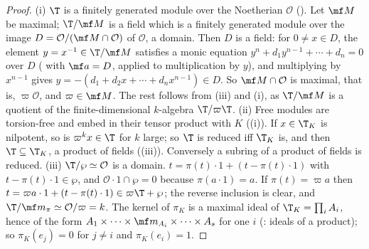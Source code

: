 \begin{proof}
(i) $\T$ is a finitely generated module over the Noetherian $\mathcal O$ (). Let $\mf M$ be maximal; $\T/\mf M$ is a field which is a finitely
generated module over the image $D=\mathcal O/(\mf M\cap\mathcal O)$ of $\mathcal O$, a domain. Then $D$ is a field: for $0\ne x\in D$, the element $y=x^{-1}\in\T/\mf M$ satisfies a monic
equation $y^n+d_1y^{n-1}+\cdots+d_n=0$ over $D$ ( with $\mf a=D$, applied to multiplication by $y$), and multiplying by $x^{n-1}$
gives $y=-(d_1+d_2x+\cdots+d_nx^{n-1})\in D$. So $\mf M\cap\mathcal O$ is maximal, that is, $\varpi\mathcal O$, and $\varpi\in\mf M$. The rest follows from
(iii) and (i), as $\T/\mf M$ is a quotient of the finite-dimensional $k$-algebra $\T/\varpi\T$.
(ii) Free modules are torsion-free and embed in their tensor product with $K$ ((i)). If $x\in\T_K$ is nilpotent, so is
$\varpi^kx\in\T$ for $k$ large; so $\T$ is reduced iff $\T_K$ is, and then $\T\subseteq\T_K$, a product of fields ((iii)).
Conversely a subring of a product of fields is reduced.
(iii) $\T/\wp\simeq\mathcal O$ is a domain. $t=\pi(t)\cdot1+(t-\pi(t)\cdot1)$ with $t-\pi(t)\cdot1\in\wp$, and $\mathcal O\cdot1\cap\wp=0$ because $\pi(a\cdot1)=a$. If $\pi(t)=\varpi a$ then
$t=\varpi a\cdot1+(t-\pi(t)\cdot1)\in\varpi\T+\wp$; the reverse inclusion is clear, and $\T/\mf m_\pi\simeq\mathcal O/\varpi=k$. The kernel of $\pi_K$ is a maximal ideal of
$\T_K=\prod_iA_i$, hence of the form $A_1\times\cdots\times\mf m_{A_i}\times\cdots\times A_s$ for one $i$ (: ideals of a product); so $\pi_K(e_j)=0$ for $j\ne i$
and $\pi_K(e_i)=1$.
\end{proof}

